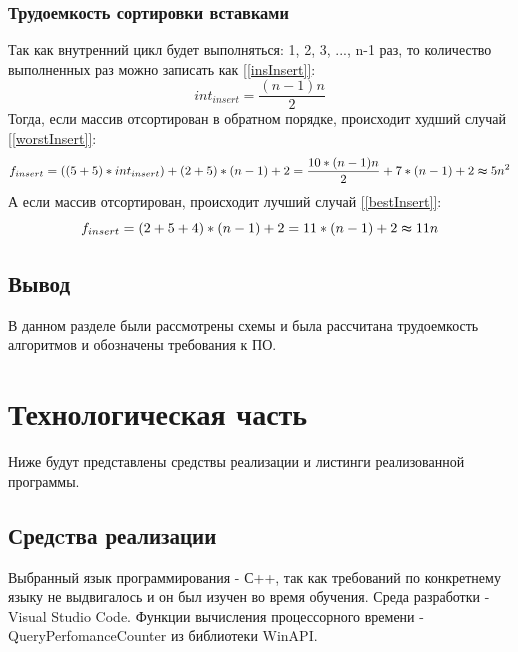 \documentclass{article}
\begin{document}
	\subsubsection{Трудоемкость сортировки вставками}
		Так как внутренний цикл будет выполняться: 1, 2, 3, ..., n-1 раз, то количество выполненных раз можно записать как \hyperref[insInsert]{[\ref{insInsert}]}:
\begin{equation}\label{insInsert}
	int_{insert}=\frac{(n-1)n}{2}
\end{equation}
	Тогда, если массив отсортирован в обратном порядке, происходит худший случай \hyperref[worstInsert]{[\ref{worstInsert}]}:
	\begin{equation}\label{worstInsert}
		f_{insert} = ((5 + 5) * int_{insert}) + (2 + 5) * (n - 1) + 2 =
		 \frac{10 * (n-1)n}{2} + 7 * (n - 1) + 2 \thickapprox 5n^2
	\end{equation}
	А если массив отсортирован, происходит лучший случай \hyperref[bestInsert]{[\ref{bestInsert}]}:
	\begin{equation}\label{bestInsert}
		f_{insert} = (2 + 5 + 4) * (n - 1) + 2 = 11 * (n - 1) + 2 \thickapprox 11n
	\end{equation}

	\subsection{Вывод}
	В данном разделе были рассмотрены схемы и была рассчитана трудоемкость алгоритмов и обозначены требования к ПО.
	
	\newpage
	\section{Технологическая часть}
	Ниже будут представлены средствы реализации и листинги реализованной программы.
	\subsection{Средcтва реализации}
	Выбранный язык программирования - С++, так как требований по конкретнему языку не выдвигалось и он был изучен во время обучения. Среда разработки - Visual Studio Code.\cite{vs-code}
	\newline
	\indent Функции вычисления процессорного времени - QueryPerfomanceCounter из библиотеки WinAPI.\cite{winapi}
	
\end{document}
